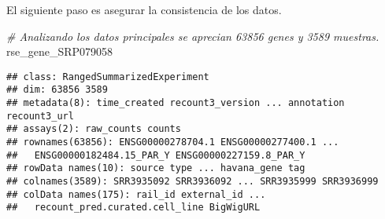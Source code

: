 \documentclass[
]{article}
\newenvironment{Shaded}{\begin{snugshade}}{\end{snugshade}}
\newcommand{\CommentTok}[1]{\textcolor[rgb]{0.56,0.35,0.01}{\textit{#1}}}
\newcommand{\DecValTok}[1]{\textcolor[rgb]{0.00,0.00,0.81}{#1}}
\newcommand{\NormalTok}[1]{#1}
\newcommand{\SpecialCharTok}[1]{\textcolor[rgb]{0.00,0.00,0.00}{#1}}
\begin{document}
El siguiente paso es asegurar la consistencia de los datos.

\begin{Shaded}
\begin{Highlighting}[]
\CommentTok{\# Analizando los datos principales se aprecian 63856 genes y 3589 muestras.}
\NormalTok{rse\_gene\_SRP079058}
\end{Highlighting}
\end{Shaded}

\begin{verbatim}
## class: RangedSummarizedExperiment 
## dim: 63856 3589 
## metadata(8): time_created recount3_version ... annotation recount3_url
## assays(2): raw_counts counts
## rownames(63856): ENSG00000278704.1 ENSG00000277400.1 ...
##   ENSG00000182484.15_PAR_Y ENSG00000227159.8_PAR_Y
## rowData names(10): source type ... havana_gene tag
## colnames(3589): SRR3935092 SRR3936092 ... SRR3935999 SRR3936999
## colData names(175): rail_id external_id ...
##   recount_pred.curated.cell_line BigWigURL
\end{verbatim}

\begin{Shaded}
\end{Shaded}
\end{document}

